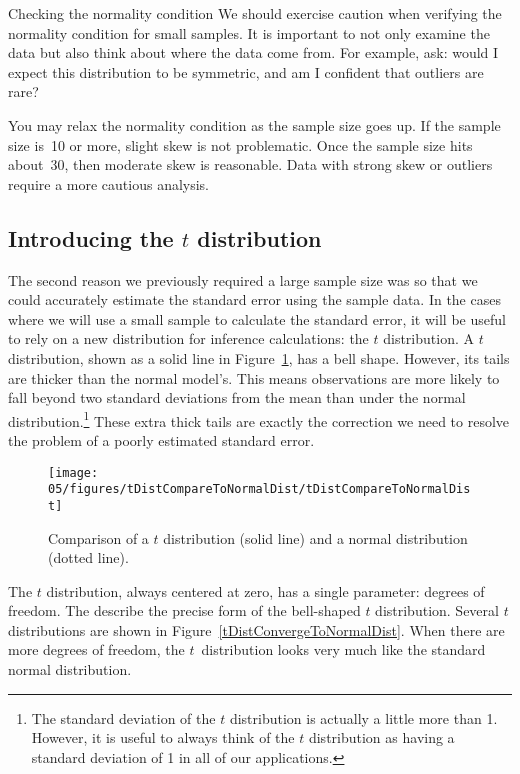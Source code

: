 \begin{caution}
{Checking the normality condition}
{We should exercise caution when verifying the normality condition for small samples. It is important to not only examine the data but also think about where the data come from. For example, ask: would I expect this distribution to be symmetric, and am I confident that outliers are rare?}
\end{caution}

You may relax the normality condition as the sample size goes up. If the sample size is~10 or more, slight skew is not problematic. Once the sample size hits about~30, then moderate skew is reasonable. Data with strong skew or outliers require a more cautious analysis.


\subsection{Introducing the $t$ distribution}
\label{introducingTheTDistribution}


The second reason we previously required a large sample size was so that we could accurately estimate the standard error using the sample data. In the cases where we will use a small sample to calculate the standard error, it will be useful to rely on a new distribution for inference calculations: the $t$ distribution. A $t$ distribution, shown as a solid line in Figure~\ref{tDistCompareToNormalDist}, has a bell shape. However, its tails are thicker than the normal model's. This means observations are more likely to fall beyond two standard deviations from the mean than under the normal distribution.\footnote{The standard deviation of the $t$ distribution is actually a little more than 1. However, it is useful to always think of the $t$ distribution as having a standard deviation of 1 in all of our applications.} These extra thick tails are exactly the correction we need to resolve the problem of a poorly estimated standard error.

\begin{figure}
\centering
\texttt{[image: 05/figures/tDistCompareToNormalDist/tDistCompareToNormalDist]}
\caption{Comparison of a $t$ distribution (solid line) and a normal distribution (dotted line).}
\label{tDistCompareToNormalDist}
\end{figure}

The $t$ distribution, always centered at zero, has a single parameter: degrees of freedom. The  describe the precise form of the bell-shaped $t$ distribution. Several $t$ distributions are shown in Figure~\ref{tDistConvergeToNormalDist}. When there are more degrees of freedom, the $t$~distribution looks very much like the standard normal distribution.

